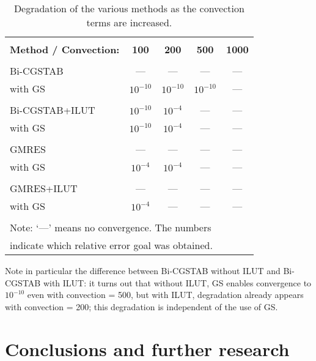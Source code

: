\documentclass[12pt,a4paper]{article}
\newcounter{i}
\begin{document}
\begin{table}[!h]
\centering
\begin{tabular}{|l|c|c|c|c|}
\hline
&&&&\\[-12pt]
{\bf Method / Convection:} & {\bf 100} & {\bf 200} &
{\bf 500} & {\bf 1000} \\
\hline
&&&&\\[-12pt]
Bi-CGSTAB & --- & --- & --- & --- \\
with GS   & $10^{-10}$ & $10^{-10}$ & $10^{-10}$ & --- \\
\hline
&&&&\\[-12pt]
Bi-CGSTAB+ILUT & $10^{-10}$ & $10^{-4}$ & --- & --- \\
with GS        & $10^{-10}$ & $10^{-4}$ & --- & --- \\
\hline
&&&&\\[-12pt]
GMRES & --- & --- & --- & --- \\
with GS & $10^{-4}$ & $10^{-4}$ & --- & --- \\
\hline
&&&&\\[-12pt]
GMRES+ILUT & --- & --- & --- & --- \\
with GS    & $10^{-4}$ & --- & --- & --- \\

\hline
\multicolumn{5}{|l|}{}\\[-12pt]
\multicolumn{5}{|l|}{Note: `---' means no convergence. The numbers} \\
\multicolumn{5}{|l|}{indicate which relative error goal was obtained.} \\
\hline
\end{tabular}
\caption{Degradation of the various methods as the convection
terms are increased.}
\label{limit}
\end{table}

Note in particular the difference between Bi-CGSTAB without ILUT
and Bi-CGSTAB with ILUT: it turns out that without ILUT, GS enables
convergence to $10^{-10}$ even with convection = 500, but with ILUT,
degradation already appears with convection = 200; this degradation
is independent of the use of GS.  



\section{Conclusions and further research}
\label{conclusions}
\end{document}

